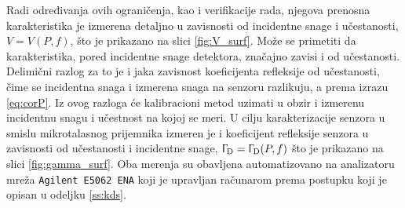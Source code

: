 \documentclass[a4paper, 12pt, diplomski]{etf}
\begin{document}
%
Radi određivanja ovih ograničenja, kao i verifikacije rada,  njegova prenosna 
karakteristika je izmerena detaljno 
u zavisnosti od incidentne snage i učestanosti, 
$V = V(P, f)$, 
što je prikazano na slici 
\ref{fig:V_surf}. Može se primetiti da karakteristika,
pored 
incidentne snage
detektora, značajno zavisi i od učestanosti. Delimični razlog za 
to je i jaka zavisnost koeficijenta refleksije od učestanosti, čime se incidentna snaga 
i izmerena snaga na senzoru razlikuju, a 
prema izrazu \eqref{eq:corP}.
Iz ovog razloga će kalibracioni metod 
uzimati u obzir i izmerenu incidentnu snagu
i učestnost na kojoj se meri.
U cilju karakterizacije senzora u smislu mikrotalasnog prijemnika
izmeren je i koeficijent refleksije senzora u zavisnosti od učestanosti i incidentne snage, $\Upgamma_{\rm D} = 
\Upgamma_{\rm D}(P, f)$ što je prikazano na slici 
\ref{fig:gamma_surf}. Oba merenja su obavljena 
automatizovano na analizatoru mreža 
\texttt{Agilent E5062 ENA} koji je upravljan računarom
prema postupku
koji je opisan u odeljku \ref{ss:kds}.
\end{document}
